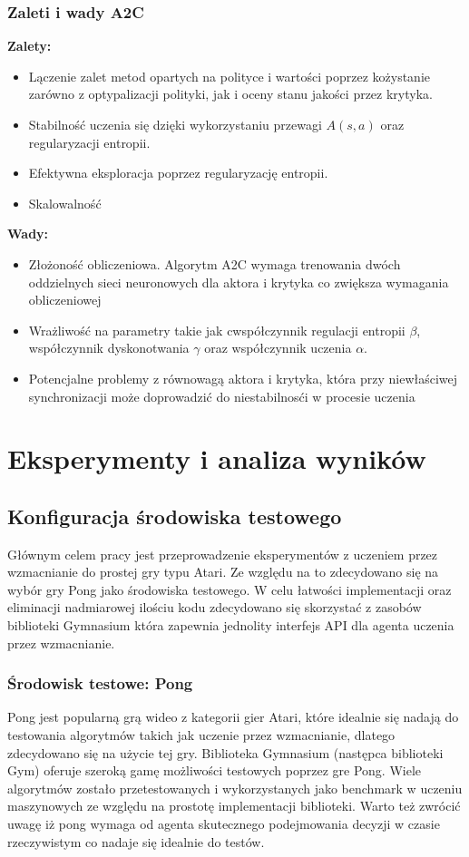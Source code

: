 \documentclass[a4paper, 12pt]{article}
\begin{document}
    \subsubsection{Zaleti i wady A2C}
    \noindent \textbf{Zalety:}
    \begin{itemize}
        \item Lączenie zalet metod opartych na polityce i wartości poprzez kożystanie zarówno z optypalizacji polityki, jak i oceny stanu jakości przez krytyka.
        \item Stabilność uczenia się dzięki wykorzystaniu przewagi \( A(s,a) \) oraz regularyzacji entropii.
        \item Efektywna eksploracja poprzez regularyzację entropii.
        \item Skalowalność
    \end{itemize}
    \textbf{Wady:}
    \begin{itemize}
        \item Złożoność obliczeniowa. Algorytm A2C wymaga trenowania dwóch oddzielnych sieci neuronowych dla aktora i krytyka co zwiększa
        wymagania obliczeniowej
        \item Wrażliwość na parametry takie jak cwspółczynnik regulacji entropii \( \beta \), współczynnik dyskonotwania \( \gamma \) 
        oraz współczynnik uczenia \( \alpha \).
        \item Potencjalne problemy z równowagą aktora i krytyka, która przy niewłaściwej synchronizacji może doprowadzić do niestabilnosći w procesie uczenia
    \end{itemize}
    \section{Eksperymenty i analiza wyników}
    \subsection{Konfiguracja środowiska testowego}
    Głównym celem pracy jest przeprowadzenie eksperymentów z uczeniem przez wzmacnianie do prostej gry typu Atari. 
    Ze względu na to zdecydowano się na wybór gry Pong jako środowiska testowego. W celu łatwości implementacji oraz eliminacji
    nadmiarowej ilościu kodu zdecydowano się skorzystać z zasobów biblioteki Gymnasium która zapewnia jednolity
    interfejs API dla agenta uczenia przez wzmacnianie.
    \subsubsection{Środowisk testowe: Pong}
    Pong jest popularną grą wideo z kategorii gier Atari, które idealnie się nadają do testowania algorytmów takich jak uczenie przez wzmacnianie,
    dlatego zdecydowano się na użycie tej gry. Biblioteka Gymnasium (następca biblioteki Gym) oferuje szeroką gamę możliwości testowych poprzez gre Pong.
    Wiele algorytmów zostało przetestowanych i wykorzystanych jako benchmark w uczeniu maszynowych ze względu na prostotę implementacji biblioteki. Warto też zwrócić
    uwagę iż pong wymaga od agenta skutecznego podejmowania decyzji w czasie rzeczywistym co nadaje się idealnie do testów.
\end{document}
